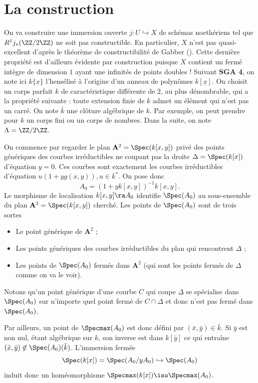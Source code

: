 \documentclass[10pt]{../fichiers-configuration-latex/smfart}
\begin{document}
\section{La construction}\label{19-cex}

On va construire une immersion ouverte $j:U\hookrightarrow X$ de schémas noethériens tel que
$R^1j_*(\ZZ/2\ZZ)$ ne soit pas constructible. En particulier, $X$ n'est pas quasi-excellent d'après
le théorème de constructibilité de Gabber (). Cette dernière
propriété est d'ailleurs évidente par construction puisque $X$ contient un fermé intègre de
dimension $1$ ayant une infinités de points doubles ! Suivant \textbf{SGA 4}, on note ici
$k\{\underline{x}\}$ l'hensélisé à l'origine d'un anneau de polynômes $k[\underline{x}]$. On choisit
un corps parfait $k$ de caractéristique différente de $2$, au plus dénombrable, qui a la propriété
suivante : toute extension finie de $k$ admet un élément qui n'est pas un carré. On note $\bar k$
une clôture algébrique de $k$.  Par exemple, on peut prendre pour $k$ un corps fini ou un corps de
nombres. Dans la suite, on note $\Lambda=\ZZ/2\ZZ$.




 On commence par regarder le plan $\mathbf{A}^2=\Spec(k[x,y])$ privé des points génériques des
courbes  irréductibles ne coupant pas la droite $\Delta=\Spec(k[x])$ d'équation $y=0$. Ces courbes
sont exactement les courbes irréductibles d'équation $u(1+yg(x,y)),u\in k^*$. On pose donc
$$A_0=(1+yk[x,y])^{-1}k[x,y].$$ Le morphisme de localisation $k[x,y]\ra A_0$ identifie $\Spec(A_0)$
au sous-ensemble du plan $\mathbf{A}^2=\Spec(k[x,y])$ cherché. Les points de $\Spec(A_0)$ sont de
trois sortes \begin{itemize} \item Le point générique de $\mathbf{A}^2$ ; \item Les points
génériques des courbes irréductibles du plan qui rencontrent $\Delta$ ; \item Les points de
$\Spec(A_0)$ fermés dans $\mathbf{A}^2$ (qui sont les points fermés de $\Delta$ comme on va le
voir).  \end{itemize}


Notons qu'un point générique d'une courbe $C$ qui coupe $\Delta$ se spécialise dans $\Spec(A_0)$ sur
n'importe quel point fermé de $C\cap \Delta$ et donc n'est pas fermé dans $\Spec(A_0)$.

Par ailleurs, un point de $\Specmax(A_0)$ est donc défini par $(\bar x,\bar y)\in\bar k$. Si $\bar
y$ est non nul, étant algébrique sur $k$, son inverse est dans $k[\bar y]$ ce qui entraîne $(\bar
x,\bar y)\not\in\Spec(A_0)(\bar k)$.  L'immersion fermée
$$\Spec(k[x])=\Spec(A_0/yA_0)\hookrightarrow\Spec(A_0)$$ induit donc un homéomorphisme
$\Specmax(k[x])\iso\Specmax(A_0)$.
\end{document}
